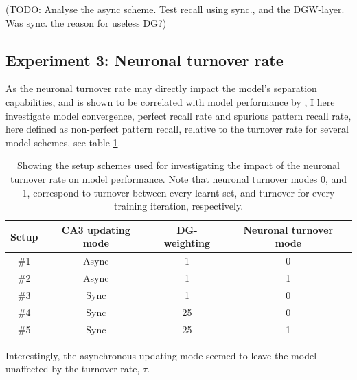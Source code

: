 (TODO: Analyse the async scheme. Test recall using sync., and the DGW-layer. Was sync. the reason for useless DG?)



\subsection{Experiment 3: Neuronal turnover rate}

As the neuronal turnover rate may directly impact the model's separation capabilities, and is shown to be correlated with model performance by \citep{Hattori2014}, I here investigate model convergence, perfect recall rate and spurious pattern recall rate, here defined as non-perfect pattern recall, relative to the turnover rate for several model schemes, see table \ref{table:turnover_schemes}.

\begin{table}[]
\centering
\caption{Showing the setup schemes used for investigating the impact of the neuronal turnover rate on model performance. Note that neuronal turnover modes 0, and 1, correspond to turnover between every learnt set, and turnover for every training iteration, respectively.}
\label{table:turnover_schemes}
\begin{tabular}{|c|c|c|c|}
\hline
Setup & CA3 updating mode & DG-weighting & Neuronal turnover mode       \\ \hline
\#1   & Async               & 1                  & 0                     \\ \hline
\#2   & Async               & 1                  & 1                     \\ \hline
\#3   & Sync                & 1                  & 0                     \\ \hline
\#4   & Sync                & 25                 & 0                     \\ \hline
\#5   & Sync                & 25                 & 1                     \\ \hline
\end{tabular}
\end{table}

Interestingly, the asynchronous updating mode seemed to leave the model unaffected by the turnover rate, $\tau$.


